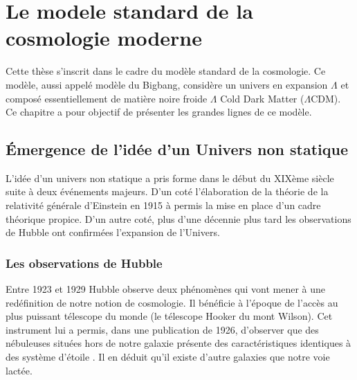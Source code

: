 \chapter{Le modele standard de la cosmologie moderne} \label{ch:introduction_physique}

Cette thèse s'inscrit dans le cadre du modèle standard de la cosmologie.
Ce modèle, aussi appelé modèle du Bigbang, considère un univers en expansion  $\Lambda$ et composé essentiellement de matière noire froide $\Lambda$ Cold Dark Matter ($\Lambda$CDM).
Ce chapitre a pour objectif de présenter les grandes lignes de ce modèle.

\section{Émergence de l'idée d'un Univers non statique}



L'idée d'un univers non statique a pris forme dans le début du XIXème siècle suite à deux événements majeurs.
D'un coté l'élaboration de la théorie de la relativité générale d'Einstein en 1915 à permis la mise en place d'un cadre théorique propice.
D'un autre coté, plus d'une décennie plus tard les observations de Hubble ont confirmées l'expansion de l'Univers.

\subsection{Les observations de Hubble}

Entre 1923 et 1929 Hubble observe deux phénomènes qui vont mener à une redéfinition de notre notion de cosmologie.
Il bénéficie à l'époque de l'accès au plus puissant télescope du monde (le télescope Hooker du mont Wilson).
Cet instrument lui a permis, dans une publication de 1926, d'observer que des nébuleuses situées hors de notre galaxie présente des caractéristiques identiques à des système d'étoile \citep{1926ApJ....63..236H}.
Il en déduit qu'il existe d'autre galaxies que notre voie lactée.

